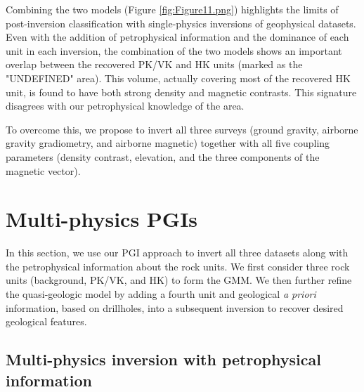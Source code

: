 \documentclass[paper, twocolumn]{geophysics} %
\begin{document}
Combining the two models (Figure \ref{fig:Figure11.png}) highlights the limits of post-inversion classification with single-physics inversions of geophysical datasets. Even with the addition of petrophysical information and the dominance of each unit in each inversion, the combination of the two models shows an important overlap between the recovered PK/VK and HK units (marked as the "UNDEFINED" area). This volume, actually covering most of the recovered HK unit, is found to have both strong density and magnetic contrasts. This signature disagrees with our petrophysical knowledge of the area.

To overcome this, we propose to invert all three surveys (ground gravity, airborne gravity gradiometry, and airborne magnetic) together with all five coupling parameters (density contrast, elevation, and the three components of the magnetic vector).


\section{Multi-physics PGIs}

In this section, we use our PGI approach to invert all three datasets along with the petrophysical information about the rock units. We first consider three rock units (background, PK/VK, and HK) to form the GMM. We then further refine the quasi-geologic model by adding a fourth unit and geological \textit{a priori} information, based on drillholes, into a subsequent inversion to recover desired geological features.


\subsection{Multi-physics inversion with petrophysical information}

\end{document}
